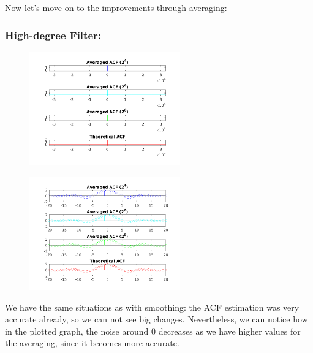 \documentclass[a4paper,11pt]{article}
\begin{document}
Now let's move on to the improvements through averaging:

\subsubsection{High-degree Filter:}

\begin{figure}[!hp]
    \begin{center}
      \includegraphics[width=0.58\textwidth]{images/study2/acf_hd_aver_plot.png}
    \end{center}
\end{figure}

\begin{figure}[!hp]
    \begin{center}
      \includegraphics[width=0.58\textwidth]{images/study2/acf_hd_aver_stem.png}
    \end{center}
\end{figure}

We have the same situations as with smoothing: the ACF estimation was very
accurate already, so we can not see big changes. Nevertheless, we can notice
how in the plotted graph, the noise around 0 decreases as we have higher values
for the averaging, since it becomes more accurate.

\newpage
\end{document}
